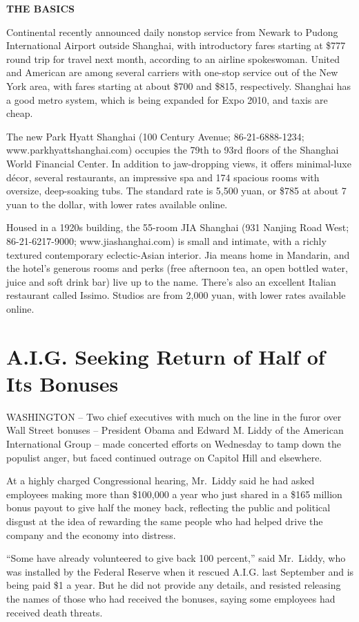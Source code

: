 \documentclass[12pt,a4paper,onecolumn]{article}
\begin{document}
\begin{CJK*}{GBK}{song}
\textbf{THE BASICS}

Continental recently announced daily nonstop service from Newark to Pudong International Airport
outside Shanghai, with introductory fares starting at \$777 round trip for travel next month,
according to an airline spokeswoman. United and American are among several carriers with one-stop
service out of the New York area, with fares starting at about \$700 and \$815, respectively.
Shanghai has a good metro system, which is being expanded for Expo 2010, and taxis are cheap.

The new Park Hyatt Shanghai (100 Century Avenue; 86-21-6888-1234; www.parkhyattshanghai.com)
occupies the 79th to 93rd floors of the Shanghai World Financial Center. In addition to jaw-dropping
views, it offers minimal-luxe d\'ecor, several restaurants, an impressive spa and 174 spacious rooms
with oversize, deep-soaking tubs. The standard rate is 5,500 yuan, or \$785 at about 7 yuan to the
dollar, with lower rates available online.

Housed in a 1920s building, the 55-room JIA Shanghai (931 Nanjing Road West; 86-21-6217-9000;
www.jiashanghai.com) is small and intimate, with a richly textured contemporary eclectic-Asian
interior. Jia means home in Mandarin, and the hotel's generous rooms and perks (free afternoon tea,
an open bottled water, juice and soft drink bar) live up to the name. There's also an excellent
Italian restaurant called Issimo. Studios are from 2,000 yuan, with lower rates available online.


\section{A.I.G. Seeking Return of Half of Its Bonuses}

WASHINGTON -- Two chief executives with much on the line in the furor over Wall Street bonuses --
President Obama and Edward M. Liddy of the American International Group -- made concerted efforts on
Wednesday to tamp down the populist anger, but faced continued outrage on Capitol Hill and
elsewhere.

At a highly charged Congressional hearing, Mr.~Liddy said he had asked employees making more than
\$100,000 a year who just shared in a \$165 million bonus payout to give half the money back,
reflecting the public and political disgust at the idea of rewarding the same people who had helped
drive the company and the economy into distress.

``Some have already volunteered to give back 100 percent,'' said Mr.~Liddy, who was installed by the
Federal Reserve when it rescued A.I.G. last September and is being paid \$1 a year. But he did not
provide any details, and resisted releasing the names of those who had received the bonuses, saying
some employees had received death threats.


\end{CJK*}
\end{document}
